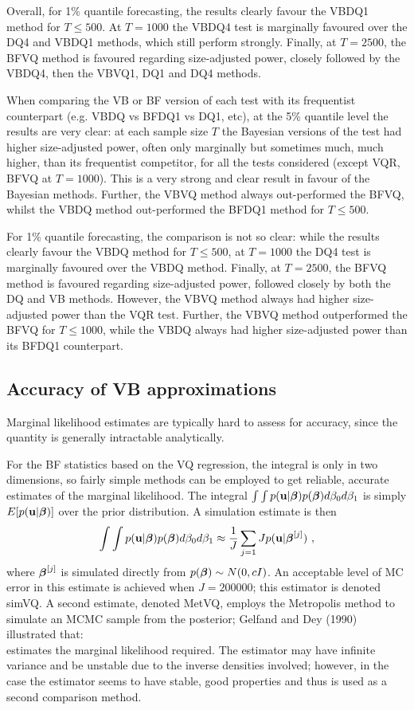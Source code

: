 \documentclass[12pt,epsf]{article}
\newcommand{\utwi}[1]{\mbox{\boldmath $ #1$}}
\begin{document}
Overall, for 1\% quantile forecasting, the results clearly favour the VBDQ1 method for $T \le 500$. At $T=1000$ the VBDQ4 test is marginally
favoured over the DQ4 and VBDQ1 methods, which still perform strongly. Finally, at $T=2500$, the BFVQ method is favoured regarding
size-adjusted power, closely followed by the VBDQ4, then the VBVQ1, DQ1 and DQ4 methods.

When comparing the VB or BF version of each test with its frequentist counterpart (e.g. VBDQ vs BFDQ1 vs DQ1, etc),
at the 5\% quantile level the results are very clear: at each sample size $T$ the Bayesian versions of the test had
higher size-adjusted power, often only marginally but sometimes much, much higher, than its frequentist competitor, for all the
tests considered (except VQR, BFVQ at $T=1000$). This is a very strong and clear result in favour of the Bayesian methods. Further,
the VBVQ method always out-performed the BFVQ, whilst the VBDQ method out-performed the BFDQ1 method for $T \le 500$.

For 1\% quantile forecasting, the comparison is not so clear: while the results clearly favour the VBDQ method for
$T \le 500$, at $T=1000$ the DQ4 test is marginally favoured over the VBDQ method. Finally, at $T=2500$, the
BFVQ method is favoured regarding size-adjusted power, followed closely by both the DQ and VB methods. However, the
VBVQ method always had higher size-adjusted power than the VQR test. Further, the VBVQ method outperformed the BFVQ for $T \le 1000$,
while the VBDQ always had higher size-adjusted power than its BFDQ1 counterpart.

\subsection{Accuracy of VB approximations}
Marginal likelihood estimates are typically hard to assess for accuracy, since the quantity is generally intractable analytically.

For the BF statistics based on the VQ regression, the integral is only in two dimensions, so fairly simple methods can be employed to get reliable,
accurate estimates of the marginal likelihood. The integral ${ \int \int p({\bf u}|\utwi{\beta}) p(\utwi{\beta}) d \beta_0 d \beta_1 }$ is simply
$E [ p({\bf u}|\utwi{\beta}) ]$ over the prior distribution. A simulation estimate is then
$$
{ \int \int p({\bf u}|\utwi{\beta}) p(\utwi{\beta}) d \beta_0 d \beta_1 } \approx \frac{1}{J} \sum_{j=1}{J} p({\bf u}|\utwi{\beta}^{[j]}) \,\, ,
$$
where $\utwi{\beta}^{[j]}$ is simulated directly from $p(\utwi{\beta}) \sim N(0,cI)$. An acceptable level of MC error in this estimate
is achieved when $J=200000$; this estimator is denoted simVQ. A second estimate, denoted MetVQ, employs the Metropolis method to
simulate an MCMC sample from the posterior; Gelfand and Dey (1990) illustrated that:
$$
$$
estimates the marginal likelihood required. The estimator may have infinite variance and be unstable due to the inverse densities
involved; however, in the case the estimator seems to have stable, good properties and thus is used as a second comparison method.
\end{document}
